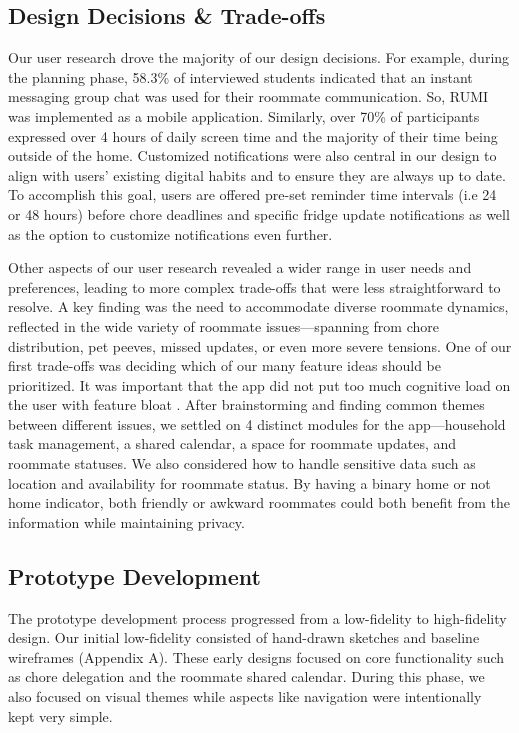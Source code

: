 \documentclass[sigconf]{acmart}
\begin{document}
\subsection{Design Decisions \& Trade-offs}
Our user research drove the majority of our design decisions. For example, during the planning phase, 58.3\% of interviewed students indicated that an instant messaging group chat was used for their roommate communication. So, RUMI was implemented as a mobile application. Similarly, over 70\% of participants expressed over 4 hours of daily screen time and the majority of their time being outside of the home. Customized notifications were also central in our design to align with users' existing digital habits and to ensure they are always up to date. To accomplish this goal, users are offered pre-set reminder time intervals (i.e 24 or 48 hours) before chore deadlines and specific fridge update notifications as well as the option to customize notifications even further.

Other aspects of our user research revealed a wider range in user needs and preferences, leading to more complex trade-offs that were less straightforward to resolve. A key finding was the need to accommodate diverse roommate dynamics, reflected in the wide variety of roommate issues---spanning from chore distribution, pet peeves, missed updates, or even more severe tensions. One of our first trade-offs was deciding which of our many feature ideas should be prioritized. It was important that the app did not put too much cognitive load on the user with feature bloat \cite{kaufman1998}. After brainstorming and finding common themes between different issues, we settled on 4 distinct modules for the app---household task management, a shared calendar, a space for roommate updates, and roommate statuses. We also considered how to handle sensitive data such as location and availability for roommate status. By having a binary home or not home indicator, both friendly or awkward roommates could both benefit from the information while maintaining privacy.

\subsection{Prototype Development}
The prototype development process progressed from a low-fidelity to high-fidelity design. Our initial low-fidelity consisted of hand-drawn sketches and baseline wireframes (Appendix A). These early designs focused on core functionality such as chore delegation and the roommate shared calendar. During this phase, we also focused on visual themes while aspects like navigation were intentionally kept very simple.
\end{document}
